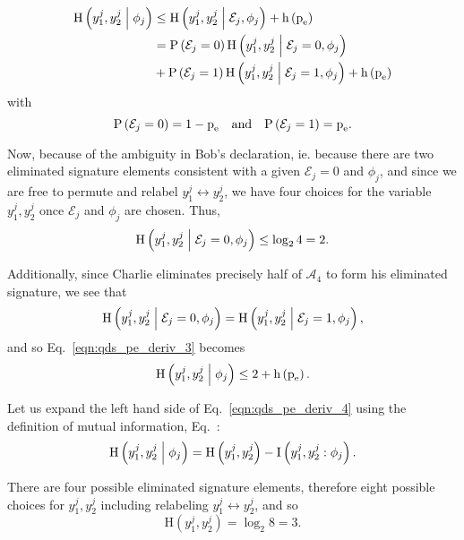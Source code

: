 \begin{align}\label{eqn:qds_pe_deriv_3}
\text{H}\left(y_1^j, y_2^j \; \middle| \; \phi_j\right) &\le \text{H}\left(y_1^j, y_2^j \; \middle| \; \mathcal{E}_j, \phi_j\right) + \text{h}\left(\text{p}_{\text{e}}\right) \notag \\
&= \text{P}\left(\mathcal{E}_j=0\right) \text{H}\left(y_1^j, y_2^j \; \middle| \; \mathcal{E}_j=0, \phi_j\right) \notag \\
&+ \text{P}\left(\mathcal{E}_j=1\right) \text{H}\left(y_1^j, y_2^j \; \middle| \; \mathcal{E}_j=1, \phi_j\right) + \text{h}\left(\text{p}_{\text{e}}\right)
\end{align}
with
\begin{equation}
\text{P}\left(\mathcal{E}_j=0\right) = 1 - \pe \qq{and} \text{P}\left(\mathcal{E}_j=1\right) = \pe.
\end{equation}

\noindent Now, because of the ambiguity in Bob's declaration, ie. because there are two eliminated signature elements consistent with a given $\mathcal{E}_j=0$ and $\phi_j$, and since we are free to permute and relabel $y_1^j \leftrightarrow y_2^j$, we have four choices for the variable $y_1^j, y_2^j$ once $\mathcal{E}_j$ and $\phi_j$ are chosen. Thus,
\begin{equation}
\text{H}\left(y_1^j, y_2^j \; \middle| \; \mathcal{E}_j=0, \phi_j\right) \le \log_2 4 = 2.
\end{equation}

\noindent Additionally, since Charlie eliminates precisely half of $\mathcal{A}_4$ to form his eliminated signature, we see that
\begin{equation}
\text{H}\left(y_1^j, y_2^j \; \middle| \; \mathcal{E}_j=0, \phi_j\right) = \text{H}\left(y_1^j, y_2^j \; \middle| \; \mathcal{E}_j=1, \phi_j\right),
\end{equation}
and so Eq.~\ref{eqn:qds_pe_deriv_3} becomes
\begin{equation}\label{eqn:qds_pe_deriv_4}
\text{H}\left(y_1^j, y_2^j \; \middle| \; \phi_j\right) \le 2 + \text{h}\left(\text{p}_{\text{e}}\right).
\end{equation}

\noindent Let us expand the left hand side of Eq.~\ref{eqn:qds_pe_deriv_4} using the definition of mutual information, Eq.~:
\begin{equation}\label{eqn:qds_pe_deriv_5}
\text{H}\left(y_1^j, y_2^j \; \middle| \; \phi_j\right) = \text{H}\left(y_1^j, y_2^j\right) - \text{I}\left(y_1^j, y_2^j : \phi_j\right).
\end{equation}

\noindent There are four possible eliminated signature elements, therefore eight possible choices for $y_1^j, y_2^j$ including relabeling $y_1^j \leftrightarrow y_2^j$, and so 
\begin{equation}
\text{H}\left(y_1^j, y_2^j\right) = \log_2 8 = 3.
\end{equation}

